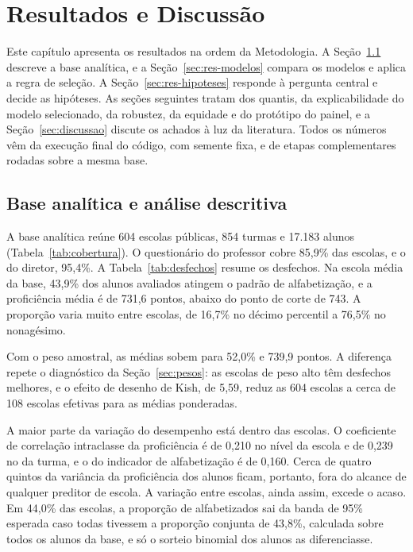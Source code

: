 \chapter{Resultados e Discussão}
\label{cap:resultados}

Este capítulo apresenta os resultados na ordem da Metodologia. A
Seção~\ref{sec:res-descritiva} descreve a base analítica, e a
Seção~\ref{sec:res-modelos} compara os modelos e aplica a regra de
seleção. A Seção~\ref{sec:res-hipoteses} responde à pergunta central e
decide as hipóteses. As seções seguintes tratam dos quantis, da
explicabilidade do modelo selecionado, da robustez, da equidade e do
protótipo do painel, e a Seção~\ref{sec:discussao} discute os achados à luz da literatura. Todos os
números vêm da execução final do código, com semente fixa, e de etapas
complementares rodadas sobre a mesma base.

\section{Base analítica e análise descritiva}
\label{sec:res-descritiva}

A base analítica reúne 604 escolas públicas, 854 turmas e 17.183 alunos
(Tabela~\ref{tab:cobertura}). O questionário do professor cobre 85,9\% das
escolas, e o do diretor, 95,4\%. A Tabela~\ref{tab:desfechos} resume os
desfechos. Na escola média da base, 43,9\% dos alunos avaliados atingem o
padrão de alfabetização, e a proficiência média é de 731,6 pontos, abaixo
do ponto de corte de 743. A proporção varia muito entre escolas, de 16,7\%
no décimo percentil a 76,5\% no nonagésimo.



Com o peso amostral, as médias sobem para 52,0\% e 739,9 pontos. A
diferença repete o diagnóstico da Seção~\ref{sec:pesos}: as escolas de
peso alto têm desfechos melhores, e o efeito de desenho de Kish, de 5,59,
reduz as 604 escolas a cerca de 108 escolas efetivas para as médias
ponderadas.

A maior parte da variação do desempenho está dentro das escolas. O
coeficiente de correlação intraclasse da proficiência é de 0,210 no nível
da escola e de 0,239 no da turma, e o do indicador de alfabetização é de
0,160. Cerca de quatro quintos da variância da proficiência dos alunos
ficam, portanto, fora do alcance de qualquer preditor de escola. A
variação entre escolas, ainda assim, excede o acaso. Em 44,0\% das escolas,
a proporção de alfabetizados sai da banda de 95\% esperada caso todas
tivessem a proporção conjunta de 43,8\%, calculada sobre todos os alunos da
base, e só o sorteio binomial dos alunos as diferenciasse.

